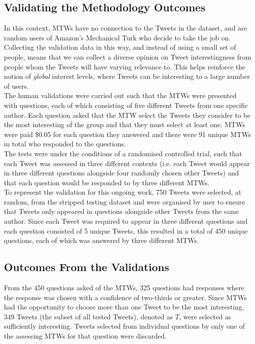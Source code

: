 \subsection{Validating the Methodology Outcomes}
In this context, MTWs have no connection to the Tweets in the dataset, and are random users of Amazon's Mechanical Turk who decide to take the job on. Collecting the validation data in this way, and instead of using a small set of people, means that we can collect a diverse opinion on Tweet interestingness from people whom the Tweets will have varying relevance to. This helps reinforce the notion of \textit{global} interest levels, where Tweets can be interesting to a large number of users.\\
The human validations were carried out such that the MTWs were presented with questions, each of which consisting of five different Tweets from one specific author. Each question asked that the MTW select the Tweets they consider to be the most interesting of the group and that they must select at least one. MTWs were paid \$0.05 for each question they answered and there were 91 unique MTWs in total who responded to the questions.\\
The tests were under the conditions of a randomised controlled trial, such that each Tweet was assessed in three different contexts (i.e. each Tweet would appear in three different questions alongside four randomly chosen other Tweets) and that each question would be responded to by three different MTWs.\\
To represent the validation for this ongoing work, 750 Tweets were selected, at random, from the stripped testing dataset and were organised by user to ensure that Tweets only appeared in questions alongside other Tweets from the same author. Since each Tweet was required to appear in three different questions and each question consisted of 5 unique Tweets, this resulted in a total of 450 unique questions, each of which was answered by three different MTWs.

\subsection{Outcomes From the Validations}
From the 450 questions asked of the MTWs, 325 questions had responses where the response was chosen with a confidence of two-thirds or greater. Since MTWs had the opportunity to choose more than one Tweet to be the most interesting, 349 Tweets (the subset of all tested Tweets), denoted as $T$, were selected as sufficiently interesting. Tweets selected from individual questions by only one of the assessing MTWs for that question were discarded.


